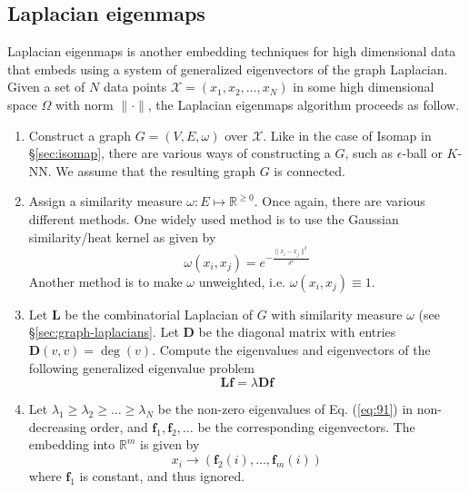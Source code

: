 \subsection{Laplacian eigenmaps}
\label{sec:laplacian-eigenmaps}
Laplacian eigenmaps \citet{belkin03:_laplac} is another embedding
techniques for high dimensional data that embeds using a system of
generalized eigenvectors of the graph Laplacian. Given a set of $N$
data points $\mathcal{X} = (x_1, x_2, \dots, x_N)$ in some high
dimensional space $\Omega$ with norm $\| \cdot \|$, the Laplacian
eigenmaps algorithm proceeds as follow.
\begin{enumerate}
\item Construct a graph $G = (V,E,\omega)$ over $\mathcal{X}$. Like in
  the case of Isomap in \S \ref{sec:isomap}, there are various ways of
  constructing a $G$, such as $\epsilon$-ball or $K$-NN. We assume
  that the resulting graph $G$ is connected. 
\item Assign a similarity measure $\omega \colon E \mapsto
  \mathbb{R}^{\geq 0}$. Once again, there are various different
  methods. One widely used method is to use the Gaussian
  similarity/heat kernel as given by
  \begin{equation}
    \label{eq:88}
    \omega(x_i,x_j) = e^{-\frac{\|x_i - x_j\|^2}{\delta^2}}
  \end{equation}
  Another method is to make $\omega$ unweighted, i.e. $\omega(x_i,x_j)
  \equiv 1$.
\item Let $\mathbf{L}$ be the combinatorial Laplacian of $G$ with
  similarity measure $\omega$ (see \S \ref{sec:graph-laplacians}. Let
  $\mathbf{D}$ be the diagonal matrix with entries $\mathbf{D}(v,v) =
  \deg(v)$. Compute the eigenvalues and eigenvectors of the following
  generalized eigenvalue problem
  \begin{equation}
    \label{eq:91}
    \mathbf{Lf} = \lambda \mathbf{Df}
  \end{equation}
\item Let $\lambda_1 \geq \lambda_2 \geq \dots \geq \lambda_N$ be the
  non-zero eigenvalues of Eq. (\ref{eq:91}) in non-decreasing order,
  and $\mathbf{f}_1, \mathbf{f}_2, \dots$ be the corresponding
  eigenvectors. The embedding into $\mathbb{R}^{m}$ is given by
  \begin{equation}
    \label{eq:92}
    x_i \rightarrow (\mathbf{f}_2(i), \dots, \mathbf{f}_{m}(i))
  \end{equation}
  where $\mathbf{f}_1$ is constant, and thus ignored.  
\end{enumerate}

